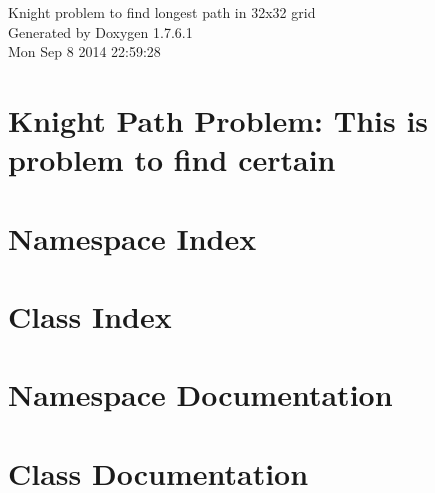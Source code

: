 \documentclass[a4paper]{book}
\begin{document}
\hypersetup{pageanchor=false,citecolor=blue}
\begin{titlepage}
\vspace*{7cm}
\begin{center}
{\Large \-Knight problem to find longest path in 32x32 grid }\\
\vspace*{1cm}
{\large \-Generated by Doxygen 1.7.6.1}\\
\vspace*{0.5cm}
{\small Mon Sep 8 2014 22:59:28}\\
\end{center}
\end{titlepage}
\clearemptydoublepage
{}
\tableofcontents
\clearemptydoublepage
{}
\hypersetup{pageanchor=true,citecolor=blue}
\chapter{\-Knight \-Path \-Problem\-: \-This is problem to find certain}
\label{index}\hypertarget{index}{}
\chapter{\-Namespace \-Index}

\chapter{\-Class \-Index}

\chapter{\-Namespace \-Documentation}

\chapter{\-Class \-Documentation}













\printindex
\end{document}
